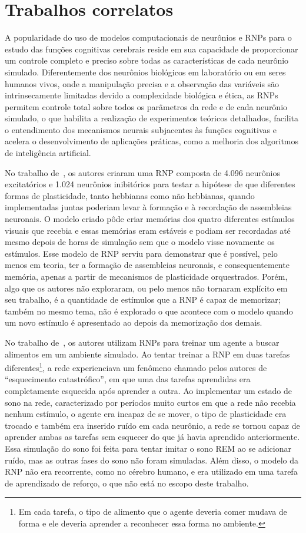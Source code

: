 \section{Trabalhos correlatos}

A popularidade do uso de modelos computacionais de neurônios e RNPs para o estudo das funções cognitivas cerebrais reside em sua
capacidade de proporcionar um controle completo e preciso sobre todas as características de cada neurônio simulado. Diferentemente
dos neurônios biológicos em laboratório ou em seres humanos vivos, onde a manipulação precisa e a observação das variáveis são
intrinsecamente limitadas devido a complexidade biológica e ética, as RNPs permitem controle total sobre todos os parâmetros da
rede e de cada neurônio simulado, o que habilita a realização de experimentos teóricos detalhados, facilita o entendimento dos
mecanismos neurais subjacentes às funções cognitivas e acelera o desenvolvimento de aplicações práticas, como a melhoria dos
algoritmos de inteligência artificial. 

No trabalho de~, os autores criaram uma RNP composta de 4.096 neurônios excitatórios e 1.024
neurônios inibitórios para testar a hipótese de que diferentes formas de plasticidade, tanto hebbianas como não hebbianas, quando
implementadas juntas poderiam levar à formação e à recordação de assembleias neuronais. O modelo criado pôde criar memórias dos
quatro diferentes estímulos visuais que recebia e essas memórias eram estáveis e podiam ser recordadas até mesmo depois de horas
de simulação sem que o modelo visse novamente os estímulos. Esse modelo de RNP serviu para demonstrar que é possível, pelo menos
em teoria, ter a formação de assembleias neuronais, e consequentemente memória, apenas a partir de mecanismos de plasticidade
orquestrados. Porém, algo que os autores não exploraram, ou pelo menos não tornaram explícito em seu trabalho, é a quantidade de
estímulos que a RNP é capaz de memorizar; também no mesmo tema, não é explorado o que acontece com o modelo quando um novo
estímulo é apresentado ao depois da memorização dos demais.

No trabalho de~, os autores utilizam RNPs para treinar um agente a buscar alimentos em um ambiente
simulado. Ao tentar treinar a RNP em duas tarefas diferentes\footnote{Em cada tarefa, o tipo de alimento que o agente deveria
comer mudava de forma e ele deveria aprender a reconhecer essa forma no ambiente.}, a rede experienciava um fenômeno chamado pelos
autores de ``esquecimento catastrófico'', em que uma das tarefas aprendidas era completamente esquecida após aprender a outra. Ao
implementar um estado de sono na rede, caracterizado por períodos muito curtos em que a rede não recebia nenhum estímulo, o agente
era incapaz de se mover, o tipo de plasticidade era trocado e também era inserido ruído em cada neurônio, a rede se tornou capaz
de aprender ambas as tarefas sem esquecer do que já havia aprendido anteriormente. Essa simulação do sono foi feita para tentar
imitar o sono REM ao se adicionar ruído, mas as outras fases do sono não foram simuladas. Além disso, o modelo da RNP não era
recorrente, como no cérebro humano, e era utilizado em uma tarefa de aprendizado de reforço, o que não está no escopo deste
trabalho.

